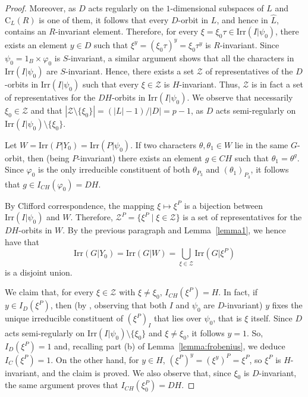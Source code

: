 \documentclass{amsart}
\def\cent#1#2{\mathrm{C}_{{#1}}{{(#2)}}}
\def\irr#1{\mathrm{Irr}(#1)}
\begin{document}
\begin{proof}
 Moreover, as $D$ acts regularly on the $1$-dimensional subspaces of $L$ and $\cent{L}R$ is one of them,
 it follows that every $D$-orbit in $L$,
 and hence in $\widehat{L}$, contains an $R$-invariant element.
 Therefore, for every $\xi = \xi_0\tau \in \irr{I| \psi_0}$, there exists an element $y \in D$ such that $\xi^y = (\xi_0\tau)^y = \xi_0\tau^y$ is
 $R$-invariant. Since $\psi_0 = 1_B \times \varphi_0$ is $S$-invariant,  a similar argument shows that all the  characters in $\irr{I| \psi_0}$ are $S$-invariant.
 Hence, there exists a set $\mathcal{Z}$ of representatives of the $D$-orbits in $\irr{I|\psi_0}$ such that every
 $\xi \in \mathcal{Z}$ is $H$-invariant. Thus, $\mathcal{Z}$ is in fact a set of representatives for the
 $DH$-orbits in $\irr{I|\psi_0}$. We observe that necessarily $\xi_0 \in \mathcal{Z}$ and that
 $|\mathcal{Z}\setminus \{ \xi_0 \}| = (|L| -1)/|D| = p-1$, as $D$ acts semi-regularly on $\irr{I| \psi_0} \setminus \{ \xi_0\}$.



 Let $W = \irr{P| Y_0}  =  \irr{P| \psi_0}$.
 If two characters $\theta, \theta_1 \in W$ lie in the same $G$-orbit, then (being $P$-invariant) there exists an element
 $g \in CH$ such that $\theta_1 = \theta^g$.
 Since $\varphi_0$ is the only irreducible constituent of  both $\theta_{P_3}$ and $(\theta_1)_{P_3}$, it follows that
  $g \in I_{CH}(\varphi_0) = DH$.

By Clifford correspondence, the mapping $\xi \mapsto \xi^P$ is a bijection between $\irr{I| \psi_0}$ and $W$.
Therefore,  $\mathcal{Z}^P = \{\xi^P \mid \xi \in \mathcal{Z}\}$ is a set of representatives for the  $DH$-orbits in $W$. By the previous paragraph and Lemma~\ref{lemma1}, we hence have that
$$\irr{G|Y_0}=\irr{G|W}=\bigcup_{\xi\in \mathcal{Z}}\irr{G|\xi^P}$$
is a disjoint union.

We claim  that, for every $\xi \in \mathcal{Z}$ with $\xi \neq \xi_0$,   $I_{CH}(\xi^P) = H$.
 In fact, if $y \in I_D(\xi^P)$, then (by \cite[Theorem 6.11(c)]{isaacs}, observing that both $I$ and
 $\psi_0$ are $D$-invariant) $y$ fixes the unique  irreducible constituent of $(\xi^P)_I$ that lies over $\psi_0$, that is $\xi$ itself.
 Since $D$ acts semi-regularly on $\irr{I| \psi_0}\setminus\{\xi_0\}$ and $\xi \neq \xi_0$, it follows $y= 1$. So,  $I_D(\xi^P) = 1$ and,
 recalling part (b) of Lemma~\ref{lemma:frobenius}, we deduce $I_C(\xi^P) = 1$.
 On the other hand, for $y \in H$, $(\xi^P)^y = (\xi^y)^P = \xi^P$, so  $\xi^P$ is $H$-invariant, and the claim is proved.
 We also observe that, since $\xi_0$ is $D$-invariant,  the same argument proves that $I_{CH}(\xi_0^P) = DH$.


\end{proof}
\end{document}

